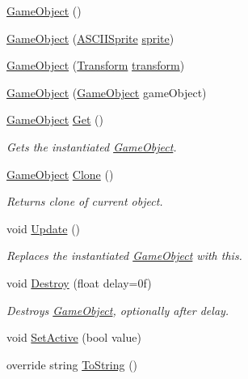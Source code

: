 \begin{DoxyCompactItemize}
\item 
\mbox{\hyperlink{class_retro_engine_1_1_game_object_addeff57df5f8e9edd369565a67e45723}{Game\+Object}} ()
\item 
\mbox{\hyperlink{class_retro_engine_1_1_game_object_a33666a7803940401faf817cd9a48aa1d}{Game\+Object}} (\mbox{\hyperlink{class_retro_engine_1_1_a_s_c_i_i_sprite}{A\+S\+C\+I\+I\+Sprite}} \mbox{\hyperlink{class_retro_engine_1_1_game_object_ac8f322b9fa5abb6664116b0c4cacf277}{sprite}})
\item 
\mbox{\hyperlink{class_retro_engine_1_1_game_object_a5386dfc20fc18a456409af3b31de2386}{Game\+Object}} (\mbox{\hyperlink{class_retro_engine_1_1_transform}{Transform}} \mbox{\hyperlink{class_retro_engine_1_1_game_object_a74571987066a58b56e5f17f57da239e7}{transform}})
\item 
\mbox{\hyperlink{class_retro_engine_1_1_game_object_a7ed89314b0fb0de9ea3a7c3fc4b85505}{Game\+Object}} (\mbox{\hyperlink{class_retro_engine_1_1_game_object}{Game\+Object}} game\+Object)
\item 
\mbox{\hyperlink{class_retro_engine_1_1_game_object}{Game\+Object}} \mbox{\hyperlink{class_retro_engine_1_1_game_object_adddb1e0ce43e32f5747258d9b92a66c0}{Get}} ()
\begin{DoxyCompactList}\small\item\em Gets the instantiated \mbox{\hyperlink{class_retro_engine_1_1_game_object}{Game\+Object}}. \end{DoxyCompactList}\item 
\mbox{\hyperlink{class_retro_engine_1_1_game_object}{Game\+Object}} \mbox{\hyperlink{class_retro_engine_1_1_game_object_a6a9c9d0afa618405eaf09e7c8dc85280}{Clone}} ()
\begin{DoxyCompactList}\small\item\em Returns clone of current object. \end{DoxyCompactList}\item 
void \mbox{\hyperlink{class_retro_engine_1_1_game_object_abf8ef044a3f18ed8440d1a6a7340aa33}{Update}} ()
\begin{DoxyCompactList}\small\item\em Replaces the instantiated \mbox{\hyperlink{class_retro_engine_1_1_game_object}{Game\+Object}} with this. \end{DoxyCompactList}\item 
void \mbox{\hyperlink{class_retro_engine_1_1_game_object_aa9204003b29511c091cb42ce70241303}{Destroy}} (float delay=0f)
\begin{DoxyCompactList}\small\item\em Destroys \mbox{\hyperlink{class_retro_engine_1_1_game_object}{Game\+Object}}, optionally after delay. \end{DoxyCompactList}\item 
void \mbox{\hyperlink{class_retro_engine_1_1_game_object_aebdebfc0989ef3a488a049fab8b2fc51}{Set\+Active}} (bool value)
\item 
override string \mbox{\hyperlink{class_retro_engine_1_1_game_object_a9cfe690613c77cce1bde19bba1ac8e9d}{To\+String}} ()
\end{DoxyCompactItemize}

